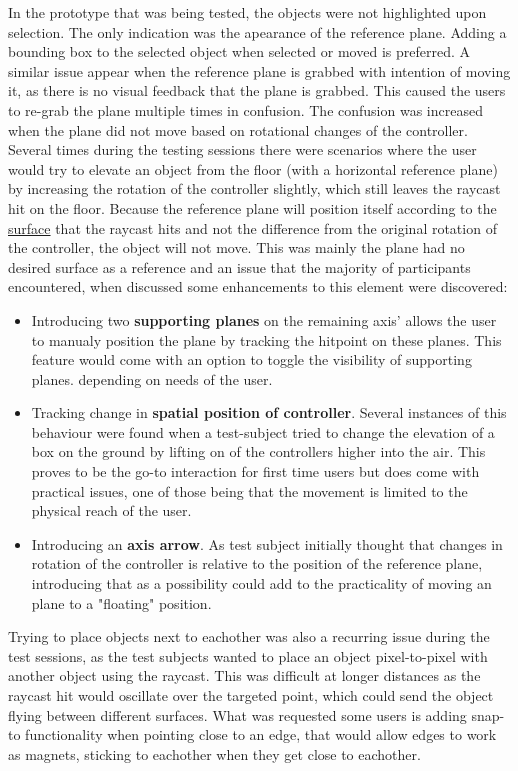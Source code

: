 In the prototype that was being tested, the objects were not highlighted upon selection. The only indication was the apearance of the reference plane. Adding a bounding box to the selected object when selected or moved is preferred. A similar issue appear when the reference plane is grabbed with intention of moving it, as there is no visual feedback that the plane is grabbed. This caused the users to re-grab the plane multiple times in confusion. The confusion was increased when the plane did not move based on rotational changes of the controller. Several times during the testing sessions there were scenarios where the user would try to elevate an object from the floor (with a horizontal reference plane) by increasing the rotation of the controller slightly, which still leaves the raycast hit on the floor. Because the reference plane will position itself according to the \underline{surface} that the raycast hits and not the difference from the original rotation of the controller, the object will not move. This was mainly the plane had no desired surface as a reference and an issue that the majority of participants encountered, when discussed some enhancements to this element were discovered:
\begin{itemize}
  \item Introducing two \textbf{supporting planes} on the remaining axis' allows the user to manualy position the plane by tracking the hitpoint on these planes. This feature would come with an option to toggle the visibility of supporting planes. depending on needs of the user.
  \item Tracking change in \textbf{spatial position of controller}. Several instances of this behaviour were found when a test-subject tried to change the elevation of a box on the ground by lifting on of the controllers higher into the air. This proves to be the go-to interaction for first time users but does come with practical issues, one of those being that the movement is limited to the physical reach of the user.
  \item Introducing an \textbf{axis arrow}. As test subject initially thought that changes in rotation of the controller is relative to the position of the reference plane, introducing that as a possibility could add to the practicality of moving an plane to a "floating" position.
\end{itemize}
Trying to place objects next to eachother was also a recurring issue during the test sessions, as the test subjects wanted to place an object pixel-to-pixel with another object using the raycast. This was difficult at longer distances as the raycast hit would oscillate over the targeted point, which could send the object flying between different surfaces. What was requested some users is adding snap-to functionality when pointing close to an edge, that would allow edges to work as magnets, sticking to eachother when they get close to eachother.

